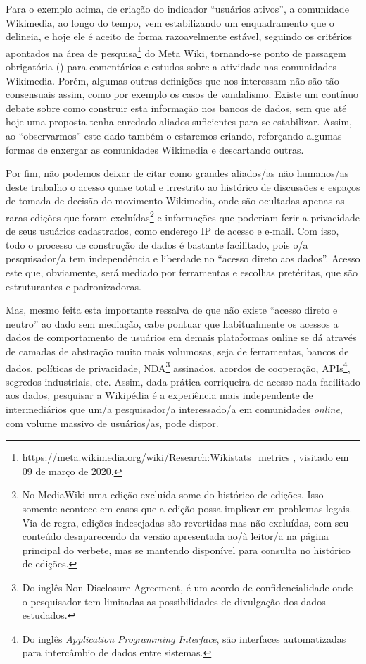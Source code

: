 Para o exemplo acima, de criação do indicador ``usuários ativos'', a comunidade Wikimedia, ao longo do tempo, vem estabilizando um enquadramento que o delineia, e hoje ele é aceito de forma razoavelmente estável, seguindo os critérios apontados na área de pesquisa\footnote{https://meta.wikimedia.org/wiki/Research:Wikistats\_metrics , visitado em 09 de março de 2020.} do Meta Wiki, tornando-se ponto de passagem obrigatória (\cite{latour_ciencia_1987}) para comentários e estudos sobre a atividade nas comunidades Wikimedia. Porém, algumas outras definições que nos interessam não são tão consensuais assim, como por exemplo os casos de vandalismo. Existe um contínuo debate sobre como construir esta informação nos bancos de dados, sem que até hoje uma proposta tenha enredado aliados suficientes para se estabilizar. Assim, ao ``observarmos'' este dado também o estaremos criando, reforçando algumas formas de enxergar as comunidades Wikimedia e descartando outras.

Por fim, não podemos deixar de citar como grandes aliados/as não humanos/as deste trabalho o acesso quase total e irrestrito ao histórico de discussões e espaços de tomada de decisão do movimento Wikimedia, onde são ocultadas apenas as raras edições que foram excluídas\footnote{No MediaWiki uma edição excluída some do histórico de edições. Isso somente acontece em casos que a edição possa implicar em problemas legais. Via de regra, edições indesejadas são revertidas mas não excluídas, com seu conteúdo desaparecendo da versão apresentada ao/à leitor/a na página principal do verbete, mas se mantendo disponível para consulta no histórico de edições.} e informações que poderiam ferir a privacidade de seus usuários cadastrados, como endereço IP de acesso e e-mail. Com isso, todo o processo de construção de dados é bastante facilitado, pois o/a pesquisador/a tem independência e liberdade no ``acesso direto aos dados''. Acesso este que, obviamente, será mediado por ferramentas e escolhas pretéritas, que são  estruturantes e padronizadoras.

Mas, mesmo feita esta importante ressalva de que não existe ``acesso direto e neutro'' ao dado sem mediação, cabe pontuar que habitualmente os acessos a dados de comportamento de usuários em demais plataformas online se dá através de camadas de abstração muito mais volumosas, seja de ferramentas, bancos de dados, políticas de privacidade, NDA\footnote{Do inglês Non-Disclosure Agreement, é um acordo de confidencialidade onde o pesquisador tem limitadas as possibilidades de divulgação dos dados estudados.} assinados, acordos de cooperação, APIs\footnote{Do inglês \textit{Application Programming Interface}, são interfaces automatizadas para intercâmbio de dados entre sistemas.}, segredos industriais, etc. Assim, dada prática corriqueira de acesso nada facilitado aos dados, pesquisar a Wikipédia é a experiência mais independente de intermediários que um/a pesquisador/a interessado/a em comunidades \textit{online}, com volume massivo de usuários/as, pode dispor.